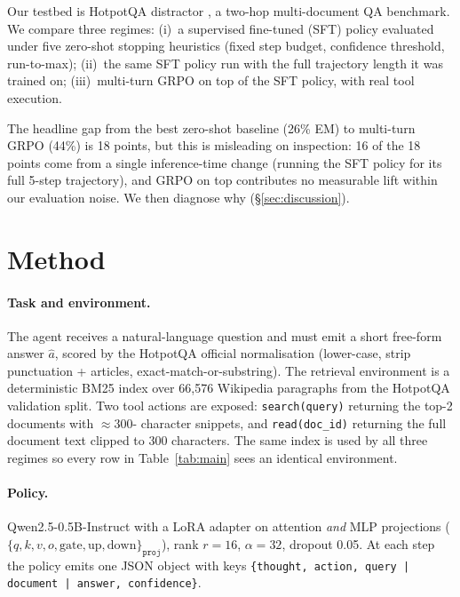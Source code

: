 \documentclass[11pt]{article}
\begin{document}
Our testbed is HotpotQA distractor \cite{hotpotqa}, a two-hop
multi-document QA benchmark. We compare three regimes: (i)~a
supervised fine-tuned (SFT) policy evaluated under five zero-shot
stopping heuristics (fixed step budget, confidence threshold,
run-to-max); (ii)~the same SFT policy run with the full trajectory
length it was trained on; (iii)~multi-turn GRPO on top of the SFT
policy, with real tool execution.

The headline gap from the best zero-shot baseline (26\% EM) to
multi-turn GRPO (44\%) is 18 points, but this is misleading on
inspection: 16 of the 18 points come from a single inference-time
change (running the SFT policy for its full 5-step trajectory),
and GRPO on top contributes no measurable lift within our
evaluation noise. We then diagnose why (\S\ref{sec:discussion}).

\vspace{-0.3em}

\section{Method}
\label{sec:method}

\paragraph{Task and environment.}
The agent receives a natural-language question and must emit a
short free-form answer $\hat a$, scored by the HotpotQA official
normalisation (lower-case, strip punctuation + articles,
exact-match-or-substring). The retrieval environment is a
deterministic BM25 index over 66{,}576 Wikipedia paragraphs from
the HotpotQA validation split. Two tool actions are exposed:
\texttt{search(query)} returning the top-2 documents with $\approx$300-
character snippets, and \texttt{read(doc\_id)} returning the full
document text clipped to 300 characters. The same index is used
by all three regimes so every row in Table~\ref{tab:main} sees an
identical environment.

\paragraph{Policy.}
Qwen2.5-0.5B-Instruct \cite{qwen25} with a LoRA adapter on
attention \emph{and} MLP projections
($\{q,k,v,o,\mathrm{gate},\mathrm{up},\mathrm{down}\}_\texttt{proj}$),
rank $r{=}16$, $\alpha{=}32$, dropout 0.05. At each step the
policy emits one JSON object with keys
\texttt{\{thought, action, query\,|\,document\,|\,answer, confidence\}}.
\end{document}
